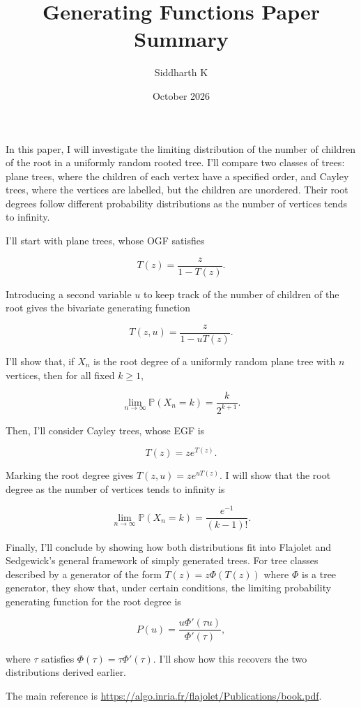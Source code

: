 \documentclass{article}
\title{Generating Functions Paper Summary}
\author{Siddharth K}
\date{October 2026}
\newcommand{\PP}{\mathbb{P}}
\begin{document}
\maketitle

In this paper, I will investigate the limiting distribution of the number of children of the root in a uniformly random rooted tree. I'll compare two classes of trees: plane trees, where the children of each vertex have a specified order, and Cayley trees, where the vertices are labelled, but the children are unordered. Their root degrees follow different probability distributions as the number of vertices tends to infinity.

I'll start with plane trees, whose OGF satisfies

\[
    T(z)=\frac{z}{1-T(z)}.
\]

Introducing a second variable $u$ to keep track of the number of children of the root gives the bivariate generating function

\[
    T(z,u)=\frac{z}{1-uT(z)}.
\]

I'll show that, if $X_n$ is the root degree of a uniformly random plane tree with $n$ vertices, then for all fixed $k \ge 1$,

\[
    \lim_{n\to\infty}\PP(X_n=k)=\frac{k}{2^{k+1}}.
\]

Then, I'll consider Cayley trees, whose EGF is

\[
    T(z)=ze^{T(z)}.
\]

Marking the root degree gives $T(z,u)=ze^{uT(z)}$. I will show that the root degree as the number of vertices tends to infinity is

\[
\lim_{n\to\infty}\PP(X_n=k)=\frac{e^{-1}}{(k-1)!}.
\]

Finally, I'll conclude by showing how both distributions fit into Flajolet and Sedgewick's general framework of simply generated trees. For tree classes described by a generator of the form $T(z) = z\Phi(T(z))$ where $\Phi$ is a tree generator, they show that, under certain conditions, the limiting probability generating function for the root degree is

\[
    P(u)=\frac{u\Phi'(\tau u)}{\Phi'(\tau)},
\]

where $\tau$ satisfies $\Phi(\tau)=\tau\Phi'(\tau)$. I'll show how this recovers the two distributions derived earlier.

The main reference is \url{https://algo.inria.fr/flajolet/Publications/book.pdf}.
\end{document}
